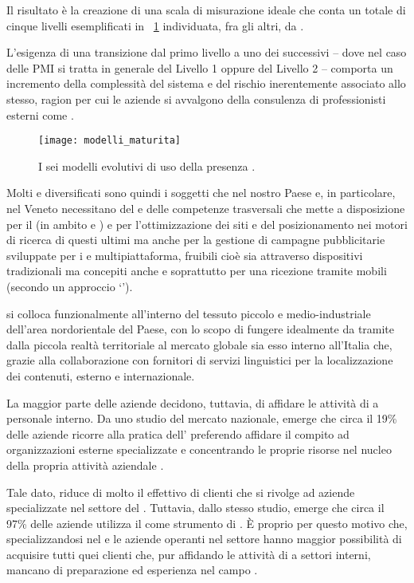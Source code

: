 Il risultato è la creazione di una scala di misurazione ideale che conta un totale di cinque livelli esemplificati in \figurename~\ref{fig:maturitylevels} individuata, fra gli altri, da \cite[\textit{pag. 90 e succ.}]{gerrard:ebusiness}.

L'esigenza di una transizione dal primo livello a uno dei successivi -- dove nel caso delle PMI si tratta in generale del Livello 1 oppure del Livello 2 -- comporta un incremento della complessità del sistema e del rischio inerentemente associato allo stesso, ragion per cui le aziende si avvalgono della consulenza di professionisti esterni come \customer.

\begin{figure}[H]
  \centering
  \texttt{[image: modelli\_maturita]}
  \caption{I sei modelli evolutivi di uso della presenza .}
  \label{fig:maturitylevels}
\end{figure}

Molti e diversificati sono quindi i soggetti che nel nostro Paese e, in particolare, nel Veneto necessitano del  e delle competenze trasversali che \customer mette a disposizione per il  \mktg (in ambito  e ) e per l'ottimizzazione dei siti e del posizionamento nei motori di ricerca di questi ultimi ma anche per la gestione di campagne pubblicitarie sviluppate  per i  e multipiattaforma, fruibili cioè sia attraverso dispositivi tradizionali ma concepiti anche e soprattutto per una ricezione tramite  mobili (secondo un approccio `').

\customer si colloca funzionalmente all'interno del tessuto piccolo e medio-industriale dell'area nordorientale del Paese, con lo scopo di fungere idealmente da tramite dalla piccola realtà territoriale al mercato globale sia esso interno all'Italia che, grazie alla collaborazione con fornitori di servizi linguistici per la localizzazione dei contenuti, esterno e internazionale.

La maggior parte delle aziende decidono, tuttavia, di affidare le attività di \mktg a personale interno. Da uno studio del mercato nazionale, emerge che circa il 19\% delle aziende ricorre alla pratica dell' preferendo affidare il compito ad organizzazioni esterne specializzate e concentrando le proprie risorse nel nucleo della propria attività aziendale \cite{picciaiola:indagine}.

Tale dato, riduce di molto il  effettivo di clienti che si rivolge ad aziende specializzate nel settore del \mktg.
Tuttavia, dallo stesso studio, emerge che circa il 97\% delle aziende utilizza il  come strumento di \mktg. È  proprio per questo motivo che, specializzandosi nel \mktg {} e  le aziende operanti nel settore hanno maggior possibilità di acquisire tutti quei clienti che, pur affidando le attività di \mktg a settori interni,  mancano di preparazione ed esperienza nel campo .

